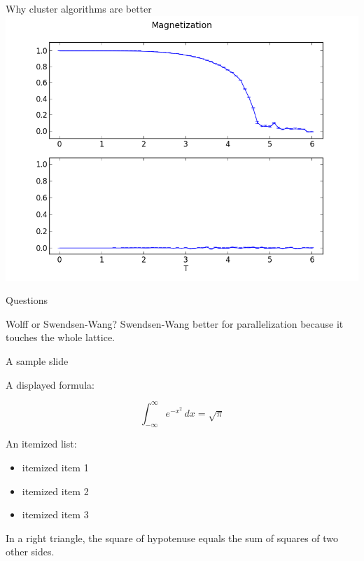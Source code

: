 \documentclass[]{beamer}
\begin{document}
\begin{frame}{Why cluster algorithms are better}
\includegraphics[width=\textwidth]{img/comp_magnetization.png}
\end{frame}


\begin{frame}
\centerline{\huge{Questions}}
\end{frame}

\begin{frame}{Wolff or Swendsen-Wang?}
Swendsen-Wang better for parallelization because it touches the whole lattice.
\end{frame}

\begin{frame}{A sample slide}

A displayed formula:

\[
  \int_{-\infty}^\infty e^{-x^2} \, dx = \sqrt{\pi}
\]

An itemized list:

\begin{itemize}
  \item itemized item 1
  \item itemized item 2
  \item itemized item 3
\end{itemize}

\begin{theorem}
  In a right triangle, the square of hypotenuse equals
  the sum of squares of two other sides.
\end{theorem}

\end{frame}
\end{document}
